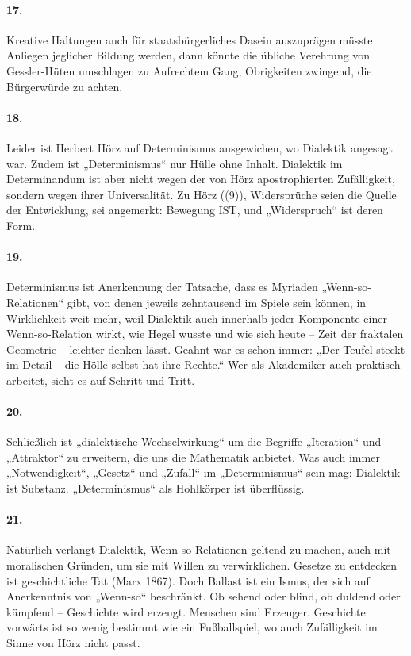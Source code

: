 \documentclass[a4paper,11pt]{article}
\begin{document}
\paragraph{17.}
Kreative Haltungen auch für staatsbürgerliches Dasein auszuprägen müsste
Anliegen jeglicher Bildung werden, dann könnte die übliche Verehrung von
Gessler-Hüten umschlagen zu Aufrechtem Gang, Obrigkeiten zwingend, die
Bürgerwürde zu achten.

\paragraph{18.}
Leider ist Herbert Hörz auf Determinismus ausgewichen, wo Dialektik angesagt
war. Zudem ist „Determinismus“ nur Hülle ohne Inhalt. Dialektik im
Determinandum ist aber nicht wegen der von Hörz apostrophierten Zufälligkeit,
sondern wegen ihrer Universalität. Zu Hörz ((9)), Widersprüche seien die
Quelle der Entwicklung, sei angemerkt: Bewegung IST, und „Widerspruch“ ist
deren Form.

\paragraph{19.}
Determinismus ist Anerkennung der Tatsache, dass es Myriaden
„Wenn-so-Relationen“ gibt, von denen jeweils zehntausend im Spiele sein
können, in Wirklichkeit weit mehr, weil Dialektik auch innerhalb jeder
Komponente einer Wenn-so-Relation wirkt, wie Hegel wusste und wie sich heute –
Zeit der fraktalen Geometrie – leichter denken lässt. Geahnt war es schon
immer: „Der Teufel steckt im Detail -- die Hölle selbst hat ihre Rechte.“ Wer
als Akademiker auch praktisch arbeitet, sieht es auf Schritt und Tritt.

\paragraph{20.}
Schließlich ist „dialektische Wechselwirkung“ um die Begriffe „Iteration“ und
„Attraktor“ zu erweitern, die uns die Mathematik anbietet.  Was auch immer
„Notwendigkeit“, „Gesetz“ und „Zufall“ im „Determinismus“ sein mag: Dialektik
ist Substanz. „Determinismus“ als Hohlkörper ist überflüssig.

\paragraph{21.}
Natürlich verlangt Dialektik, Wenn-so-Relationen geltend zu machen, auch mit
moralischen Gründen, um sie mit Willen zu verwirklichen. Gesetze zu entdecken
ist geschichtliche Tat (Marx 1867). Doch Ballast ist ein Ismus, der sich auf
Anerkenntnis von „Wenn-so“ beschränkt. Ob sehend oder blind, ob duldend oder
kämpfend -- Geschichte wird erzeugt. Menschen sind Erzeuger.  Geschichte
vorwärts ist so wenig bestimmt wie ein Fußballspiel, wo auch Zufälligkeit im
Sinne von Hörz nicht passt.
\end{document}
